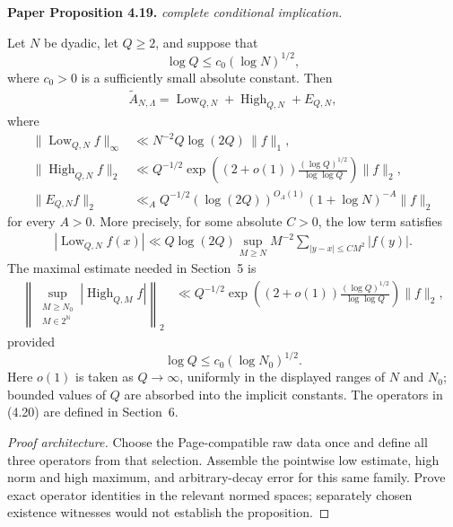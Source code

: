 \begin{lemma}
\label{prime_decomposition}
\leanok
\par\medskip\noindent\textbf{Paper Proposition 4.19.} \textit{complete conditional implication.}\par
Let \(N\) be dyadic, let \(Q\geq2\), and suppose that
\[
 \log Q\leq c_0(\log N)^{1/2},
\]
where \(c_0>0\) is a sufficiently small absolute constant.  Then
\begin{align}
 \widetilde A_{N,\Lambda}
 =
 \operatorname{Low}_{Q,N}
 +\operatorname{High}_{Q,N}+E_{Q,N},
\end{align}
where
\begin{align}
 \|\operatorname{Low}_{Q,N}f\|_\infty
 &\ll N^{-2}Q\log(2Q)\,\|f\|_1,
 \\
 \|\operatorname{High}_{Q,N}f\|_2
 &\ll Q^{-1/2}
 \exp\left(
 (2+o(1))\frac{(\log Q)^{1/2}}{\log\log Q}
 \right)\|f\|_2,
 \\
 \|E_{Q,N}f\|_2
 &\ll_A Q^{-1/2}(\log(2Q))^{O_A(1)}
 (1+\log N)^{-A}\|f\|_2
\end{align}
for every \(A>0\).  More precisely, for some absolute \(C>0\),
the low term satisfies
\begin{align}
 |\operatorname{Low}_{Q,N}f(x)|
 \ll Q\log(2Q)\sup_{M\geq N}M^{-2}
 \sum_{|y-x|\leq CM^2}|f(y)|.
\end{align}
The maximal estimate needed in Section~\textup{5} is
\begin{align}
 \left\|
 \sup_{\substack{M\geq N_0\\M\in2^{\mathbb N}}}
 |\operatorname{High}_{Q,M}f|
 \right\|_2
 &\ll Q^{-1/2}
 \exp\left(
 (2+o(1))\frac{(\log Q)^{1/2}}{\log\log Q}
 \right)\|f\|_2,
\end{align}
provided
\[
 \log Q\leq c_0(\log N_0)^{1/2}.
\]
 Here \(o(1)\) is taken as \(Q\to\infty\), uniformly in the displayed
ranges of \(N\) and \(N_0\); bounded values of \(Q\) are absorbed into
the implicit constants. 
The operators in
\textup{(4.20)} are defined in
Section~\textup{6}.
\end{lemma}
\begin{proof}[Proof architecture]
\leanok
Choose the Page-compatible raw data once and define all three operators from that selection. Assemble the pointwise low estimate, high norm and high maximum, and arbitrary-decay error for this same family. Prove exact operator identities in the relevant normed spaces; separately chosen existence witnesses would not establish the proposition.
\end{proof}

